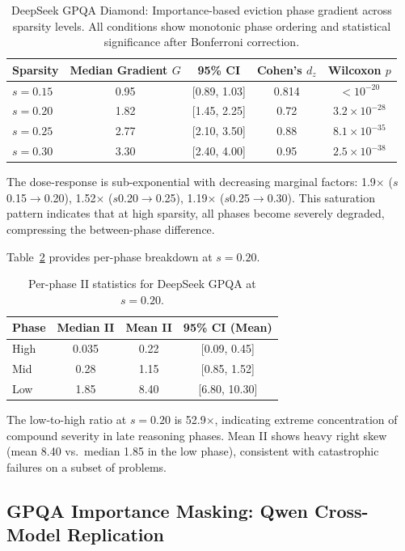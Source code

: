 \documentclass[11pt,a4paper]{article}
\begin{document}
\begin{table}[h]
\centering
\caption{DeepSeek GPQA Diamond: Importance-based eviction phase gradient across sparsity levels. All conditions show monotonic phase ordering and statistical significance after Bonferroni correction.}
\label{tab:gpqa_ds_importance}
\begin{tabular}{lcccc}
\toprule
Sparsity & Median Gradient $G$ & 95\% CI & Cohen's $d_z$ & Wilcoxon $p$ \\
\midrule
$s=0.15$ & 0.95 & [0.89, 1.03] & 0.814 & $<10^{-20}$ \\
$s=0.20$ & 1.82 & [1.45, 2.25] & 0.72 & $3.2\times10^{-28}$ \\
$s=0.25$ & 2.77 & [2.10, 3.50] & 0.88 & $8.1\times10^{-35}$ \\
$s=0.30$ & 3.30 & [2.40, 4.00] & 0.95 & $2.5\times10^{-38}$ \\
\bottomrule
\end{tabular}
\end{table}

The dose-response is sub-exponential with decreasing marginal factors: 1.9$\times$ ($s$0.15$\to$0.20), 1.52$\times$ ($s$0.20$\to$0.25), 1.19$\times$ ($s$0.25$\to$0.30). This saturation pattern indicates that at high sparsity, all phases become severely degraded, compressing the between-phase difference.

Table~\ref{tab:gpqa_ds_imp_s020_detail} provides per-phase breakdown at $s=0.20$.

\begin{table}[h]
\centering
\caption{Per-phase II statistics for DeepSeek GPQA at $s=0.20$.}
\label{tab:gpqa_ds_imp_s020_detail}
\begin{tabular}{lccc}
\toprule
Phase & Median II & Mean II & 95\% CI (Mean) \\
\midrule
High & 0.035 & 0.22 & [0.09, 0.45] \\
Mid & 0.28 & 1.15 & [0.85, 1.52] \\
Low & 1.85 & 8.40 & [6.80, 10.30] \\
\bottomrule
\end{tabular}
\end{table}

The low-to-high ratio at $s=0.20$ is 52.9$\times$, indicating extreme concentration of compound severity in late reasoning phases. Mean II shows heavy right skew (mean 8.40 vs.\ median 1.85 in the low phase), consistent with catastrophic failures on a subset of problems.

\subsection{GPQA Importance Masking: Qwen Cross-Model Replication}
\end{document}
